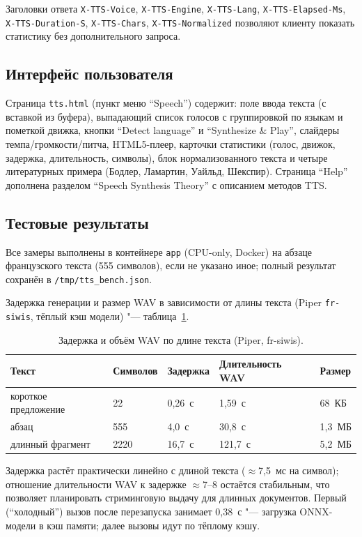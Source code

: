 Заголовки ответа \texttt{X-TTS-Voice}, \texttt{X-TTS-Engine},
\texttt{X-TTS-Lang}, \texttt{X-TTS-Elapsed-Ms}, \texttt{X-TTS-Duration-S},
\texttt{X-TTS-Chars}, \texttt{X-TTS-Normalized} позволяют клиенту
показать статистику без дополнительного запроса.

\subsection{Интерфейс пользователя}

Страница \texttt{tts.html} (пункт меню ``Speech'') содержит: поле ввода
текста (с вставкой из буфера), выпадающий список голосов с группировкой
по языкам и пометкой движка, кнопки ``Detect language'' и
``Synthesize \& Play'', слайдеры темпа/громкости/питча, HTML5-плеер,
карточки статистики (голос, движок, задержка, длительность, символы),
блок нормализованного текста и четыре литературных примера
(Бодлер, Ламартин, Уайльд, Шекспир). Страница ``Help'' дополнена
разделом ``Speech Synthesis Theory'' с описанием методов TTS.

\subsection{Тестовые результаты}

Все замеры выполнены в контейнере \texttt{app} (CPU-only, Docker)
на абзаце французского текста (555 символов), если не указано иное;
полный результат сохранён в \texttt{/tmp/tts\_bench.json}.

Задержка генерации и размер WAV в зависимости от длины текста
(Piper \texttt{fr-siwis}, тёплый кэш модели) "--- таблица~\ref{tab:tts_len}.

\begin{table}[H]
	\caption{Задержка и объём WAV по длине текста (Piper, fr-siwis).}
	\label{tab:tts_len}
	\begin{tabular}{|l|l|l|l|l|}
		\hline
		Текст & Символов & Задержка & Длительность WAV & Размер \\ \hline
		короткое предложение & 22 & 0,26~с & 1,59~с & 68~КБ \\
		абзац & 555 & 4,0~с & 30,8~с & 1,3~МБ \\
		длинный фрагмент & 2220 & 16,7~с & 121,7~с & 5,2~МБ \\ \hline
	\end{tabular}
\end{table}

Задержка растёт практически линейно с длиной текста
($\approx$7,5~мс на символ); отношение длительности WAV к задержке
$\approx$7--8 остаётся стабильным, что позволяет планировать
стриминговую выдачу для длинных документов.
Первый (``холодный'') вызов после перезапуска занимает 0,38~с "--- загрузка
ONNX-модели в кэш памяти; далее вызовы идут по тёплому кэшу.

